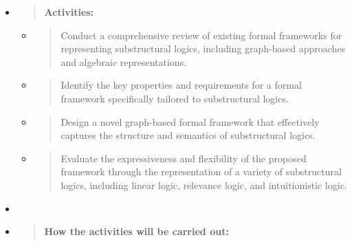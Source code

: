 \begin{itemize}
\item
  \begin{quote}
  \textbf{Activities:\\
  }
  \end{quote}

  \begin{itemize}
  \item
    \begin{quote}
    Conduct a comprehensive review of existing formal frameworks for
    representing substructural logics, including graph-based approaches
    and algebraic representations.
    \end{quote}
  \item
    \begin{quote}
    Identify the key properties and requirements for a formal framework
    specifically tailored to substructural logics.
    \end{quote}
  \item
    \begin{quote}
    Design a novel graph-based formal framework that effectively
    captures the structure and semantics of substructural logics.
    \end{quote}
  \item
    \begin{quote}
    Evaluate the expressiveness and flexibility of the proposed
    framework through the representation of a variety of substructural
    logics, including linear logic, relevance logic, and intuitionistic
    logic.
    \end{quote}
  \end{itemize}
\item
\item
  \begin{quote}
  \textbf{How the activities will be carried out:\\
  }
  \end{quote}


\end{itemize}
